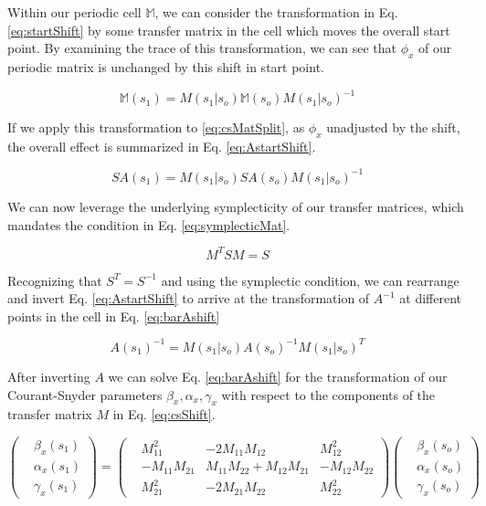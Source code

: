 Within our periodic cell $\mathbb{M}$, we can consider the transformation in Eq. \ref{eq:startShift} by some transfer matrix in the cell which moves the overall start point. By examining the trace of this transformation, we can see that $\phi_x$ of our periodic matrix is unchanged by this shift in start point.

\begin{equation} \label{eq:startShift}
	\mathbb{M}(s_1)  = M(s_1|s_o)\mathbb{M}(s_o)M(s_1|s_o)^{-1}
\end{equation}

If we apply this transformation to \ref{eq:csMatSplit}, as $\phi_x$ unadjusted by the shift, the overall effect is summarized in Eq. \ref{eq:AstartShift}.

\begin{equation} \label{eq:AstartShift}
	S A(s_1) = M(s_1|s_o) S A(s_o)M(s_1|s_o)^{-1}
\end{equation}

We can now leverage the underlying symplecticity of our transfer matrices, which mandates the condition in Eq. \ref{eq:symplecticMat}.

\begin{equation} \label{eq:symplecticMat}
	M^T S M = S
\end{equation}

Recognizing that $S^T = S^{-1}$ and using the symplectic condition, we can rearrange and invert Eq. \ref{eq:AstartShift} to arrive at the transformation of $A^{-1}$ at different points in the cell in Eq. \ref{eq:barAshift} 

\begin{equation} \label{eq:barAshift}
	A(s_1)^{-1} = M(s_1|s_o)  A(s_o)^{-1} M(s_1|s_o)^T
\end{equation}

After inverting $A$ we can solve Eq. \ref{eq:barAshift} for the transformation of our Courant-Snyder parameters $\beta_x, \alpha_x, \gamma_x$ with respect to the components of the transfer matrix $M$ in Eq. \ref{eq:csShift}.

\begin{equation} \label{eq:csShift}
	\begin{pmatrix} &\beta_x(s_1) \\ &\alpha_x(s_1)\\ &\gamma_x(s_1) \end{pmatrix} = 
	\begin{pmatrix}
		&M_{11}^2 &-2 M_{11} M_{12} &M_{12}^2\\
		&-M_{11} M_{21} &M_{11} M_{22} + M_{12} M_{21} &-M_{12}M_{22}\\
		&M_{21}^2 &-2 M_{21} M_{22} &M_{22}^2
	\end{pmatrix}
	\begin{pmatrix} &\beta_x(s_o) \\ &\alpha_x(s_o)\\ &\gamma_x(s_o) \end{pmatrix}
\end{equation}

